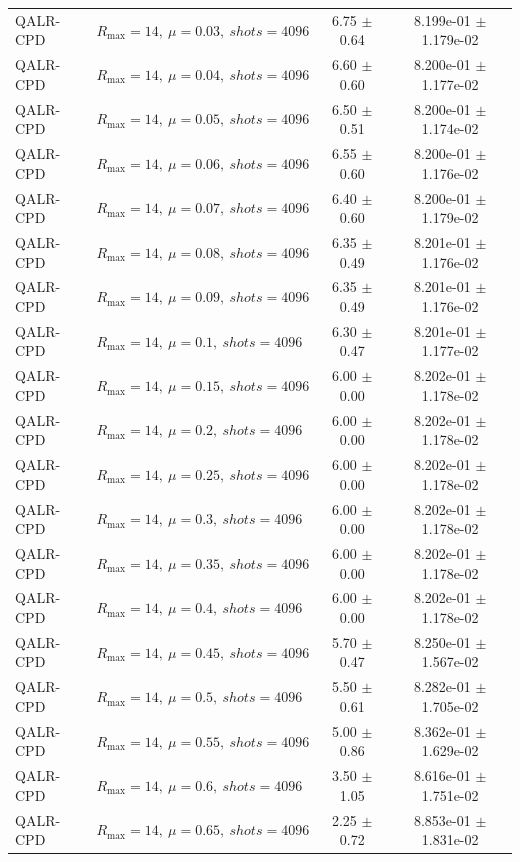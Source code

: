 \begin{table}[t]
\begin{tabular}{@{}llcc@{}}
QALR-CPD & \(R_{\max}=14,\ \mu=0.03,\ shots=4096\) & 6.75 $\pm$ 0.64 & 8.199e-01 $\pm$ 1.179e-02 \\
QALR-CPD & \(R_{\max}=14,\ \mu=0.04,\ shots=4096\) & 6.60 $\pm$ 0.60 & 8.200e-01 $\pm$ 1.177e-02 \\
QALR-CPD & \(R_{\max}=14,\ \mu=0.05,\ shots=4096\) & 6.50 $\pm$ 0.51 & 8.200e-01 $\pm$ 1.174e-02 \\
QALR-CPD & \(R_{\max}=14,\ \mu=0.06,\ shots=4096\) & 6.55 $\pm$ 0.60 & 8.200e-01 $\pm$ 1.176e-02 \\
QALR-CPD & \(R_{\max}=14,\ \mu=0.07,\ shots=4096\) & 6.40 $\pm$ 0.60 & 8.200e-01 $\pm$ 1.179e-02 \\
QALR-CPD & \(R_{\max}=14,\ \mu=0.08,\ shots=4096\) & 6.35 $\pm$ 0.49 & 8.201e-01 $\pm$ 1.176e-02 \\
QALR-CPD & \(R_{\max}=14,\ \mu=0.09,\ shots=4096\) & 6.35 $\pm$ 0.49 & 8.201e-01 $\pm$ 1.176e-02 \\
QALR-CPD & \(R_{\max}=14,\ \mu=0.1,\ shots=4096\) & 6.30 $\pm$ 0.47 & 8.201e-01 $\pm$ 1.177e-02 \\
QALR-CPD & \(R_{\max}=14,\ \mu=0.15,\ shots=4096\) & 6.00 $\pm$ 0.00 & 8.202e-01 $\pm$ 1.178e-02 \\
QALR-CPD & \(R_{\max}=14,\ \mu=0.2,\ shots=4096\) & 6.00 $\pm$ 0.00 & 8.202e-01 $\pm$ 1.178e-02 \\
QALR-CPD & \(R_{\max}=14,\ \mu=0.25,\ shots=4096\) & 6.00 $\pm$ 0.00 & 8.202e-01 $\pm$ 1.178e-02 \\
QALR-CPD & \(R_{\max}=14,\ \mu=0.3,\ shots=4096\) & 6.00 $\pm$ 0.00 & 8.202e-01 $\pm$ 1.178e-02 \\
QALR-CPD & \(R_{\max}=14,\ \mu=0.35,\ shots=4096\) & 6.00 $\pm$ 0.00 & 8.202e-01 $\pm$ 1.178e-02 \\
QALR-CPD & \(R_{\max}=14,\ \mu=0.4,\ shots=4096\) & 6.00 $\pm$ 0.00 & 8.202e-01 $\pm$ 1.178e-02 \\
QALR-CPD & \(R_{\max}=14,\ \mu=0.45,\ shots=4096\) & 5.70 $\pm$ 0.47 & 8.250e-01 $\pm$ 1.567e-02 \\
QALR-CPD & \(R_{\max}=14,\ \mu=0.5,\ shots=4096\) & 5.50 $\pm$ 0.61 & 8.282e-01 $\pm$ 1.705e-02 \\
QALR-CPD & \(R_{\max}=14,\ \mu=0.55,\ shots=4096\) & 5.00 $\pm$ 0.86 & 8.362e-01 $\pm$ 1.629e-02 \\
QALR-CPD & \(R_{\max}=14,\ \mu=0.6,\ shots=4096\) & 3.50 $\pm$ 1.05 & 8.616e-01 $\pm$ 1.751e-02 \\
QALR-CPD & \(R_{\max}=14,\ \mu=0.65,\ shots=4096\) & 2.25 $\pm$ 0.72 & 8.853e-01 $\pm$ 1.831e-02 \\

\end{tabular}
\end{table}
